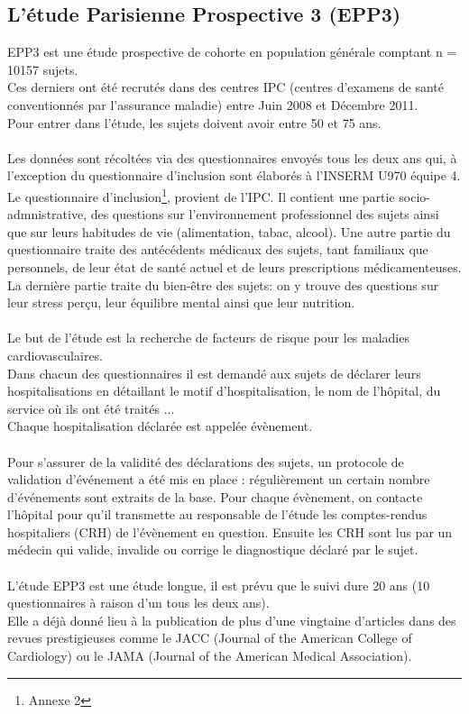 \documentclass{book}
\begin{document}
\subsection{L'étude Parisienne Prospective 3 (EPP3)}
\noindent
EPP3 \cite{empana_paris_2011} est une étude prospective de cohorte en population générale comptant n = 10157 sujets.\\
Ces derniers ont été recrutés dans des centres IPC (centres d'examens de santé conventionnés par l'assurance maladie) entre Juin 2008 et Décembre 2011.\\
Pour entrer dans l'étude, les sujets doivent avoir entre 50 et 75 ans.\\
\\
Les données sont récoltées via des questionnaires envoyés tous les deux ans qui, à l'exception du questionnaire d'inclusion sont élaborés à l'INSERM U970 équipe 4. \\
Le questionnaire d'inclusion\footnote{Annexe 2}, provient de l'IPC. Il contient une partie socio-admnistrative, des questions sur l'environnement professionnel des sujets ainsi que sur leurs habitudes de vie (alimentation, tabac, alcool). 
Une autre partie du questionnaire traite des antécédents médicaux des sujets, tant familiaux que personnels, de leur état de santé actuel et de leurs prescriptions médicamenteuses.
La dernière partie traite du bien-être des sujets: on y trouve des questions sur leur stress perçu, leur équilibre mental ainsi que leur nutrition.\\
\\
Le but de l'étude est la recherche de facteurs de risque pour les maladies cardiovasculaires.\\ 
Dans chacun des questionnaires il est demandé aux sujets de déclarer leurs hospitalisations en détaillant le motif d'hospitalisation, le nom de l'hôpital, du service où ils ont été traités ...\\
Chaque hospitalisation déclarée est appelée évènement.\\
\\
Pour s'assurer de la validité des déclarations des sujets, un protocole de validation d'événement a été mis en place : régulièrement un certain nombre d'événements sont extraits de la base. Pour chaque évènement, on contacte l'hôpital pour qu'il transmette au responsable de l'étude les comptes-rendus hospitaliers (CRH) de l'évènement en question. Ensuite les CRH sont lus par un médecin qui valide, invalide ou corrige le diagnostique déclaré par le sujet.\\
\\
L'étude EPP3 est une étude longue, il est prévu que le suivi dure 20 ans (10 questionnaires à raison d'un tous les deux ans).\\
Elle a déjà donné lieu à la publication de plus d'une vingtaine d'articles dans des revues prestigieuses comme le JACC (Journal of the American College of Cardiology) ou le JAMA (Journal of the American Medical Association).\\
\end{document}
